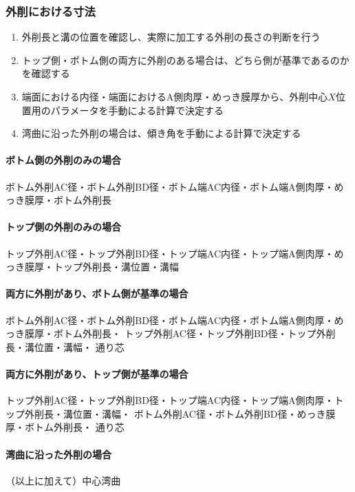 \subsubsection{外削における寸法}
\begin{enumerate}
\item {}外削長と溝の位置を確認し、実際に加工する外削の長さの判断を行う
\item トップ側・ボトム側の両方に外削のある場合は、どちら側が基準であるのかを確認する
\item 端面における内径・端面におけるA側肉厚・めっき膜厚から、外削中心$X$位置用のパラメータを手動による計算で決定する
\item 湾曲に沿った外削の場合は、傾き角を手動による計算で決定する
\end{enumerate}
\begin{Tabbox}[title={必要な図面上のパラメータ}]\small
\paragraph*{ボトム側の外削のみの場合}
ボトム外削AC径・ボトム外削BD径・ボトム端AC内径・ボトム端A側肉厚・めっき膜厚・ボトム外削長
\tcbline*
\paragraph*{トップ側の外削のみの場合}
トップ外削AC径・トップ外削BD径・トップ端AC内径・トップ端A側肉厚・めっき膜厚・トップ外削長・溝位置・溝幅
\tcbline*
\paragraph*{両方に外削があり、ボトム側が基準の場合}
ボトム外削AC径・ボトム外削BD径・ボトム端AC内径・ボトム端A側肉厚・めっき膜厚・ボトム外削長・
トップ外削AC径・トップ外削BD径・トップ外削長・溝位置・溝幅・
通り芯
\tcbline*
\paragraph*{両方に外削があり、トップ側が基準の場合}
トップ外削AC径・トップ外削BD径・トップ端AC内径・トップ端A側肉厚・トップ外削長・溝位置・溝幅・
ボトム外削AC径・ボトム外削BD径・めっき膜厚・ボトム外削長・
通り芯
\tcbline*
\paragraph*{湾曲に沿った外削の場合}
（以上に加えて）中心湾曲
\end{Tabbox}

